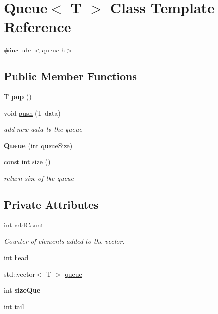 \hypertarget{class_queue}{}\section{Queue$<$ T $>$ Class Template Reference}
\label{class_queue}


{\ttfamily \#include $<$queue.\+h$>$}

\subsection*{Public Member Functions}
\begin{DoxyCompactItemize}
\item 
\hypertarget{class_queue_abeee018138cbb5226e5352a5788e23bd}{}T {\bfseries pop} ()\label{class_queue_abeee018138cbb5226e5352a5788e23bd}

\item 
void \hyperlink{class_queue_a69f99535bf8b0f40138dd047cc122dc6}{push} (T data)
\begin{DoxyCompactList}\small\item\em add new data to the queue \end{DoxyCompactList}\item 
\hypertarget{class_queue_acc7bcb68deda2adcb42243e879d404f6}{}{\bfseries Queue} (int queue\+Size)\label{class_queue_acc7bcb68deda2adcb42243e879d404f6}

\item 
const int \hyperlink{class_queue_a9d4d900136edc4d81cc7ad014b43822c}{size} ()
\begin{DoxyCompactList}\small\item\em return size of the queue \end{DoxyCompactList}\end{DoxyCompactItemize}
\subsection*{Private Attributes}
\begin{DoxyCompactItemize}
\item 
int \hyperlink{class_queue_a23216ad7a3dbc31936c378467237ce4e}{add\+Count}
\begin{DoxyCompactList}\small\item\em Counter of elements added to the vector. \end{DoxyCompactList}\item 
int \hyperlink{class_queue_a8409d616f193d95adfd31378ea47a466}{head}
\item 
std\+::vector$<$ T $>$ \hyperlink{class_queue_a8c371802bf77f0313a8b210d2ffa7113}{queue}
\item 
\hypertarget{class_queue_a2d467c8dc285b1cc40865f9c17959f5b}{}int {\bfseries size\+Que}\label{class_queue_a2d467c8dc285b1cc40865f9c17959f5b}

\item 
int \hyperlink{class_queue_a1e772a8071d79b71c433a78f10c4bf3e}{tail}
\end{DoxyCompactItemize}
